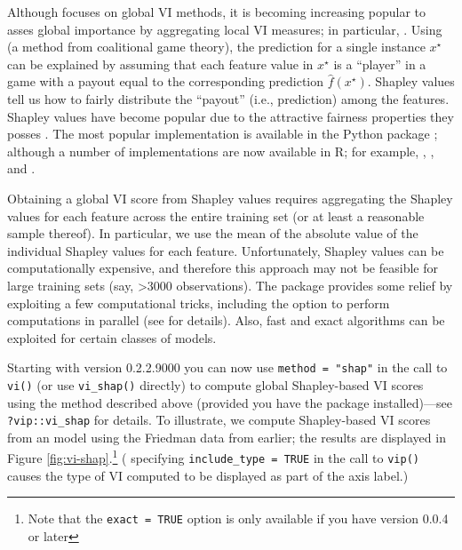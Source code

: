 Although  focuses on global VI methods, it is becoming
increasing popular to asses global importance by aggregating local VI
measures; in particular, 
\citep{strumbelj-2014-explaining}. Using  (a method
from coalitional game theory), the prediction for a single instance
\(x^\star\) can be explained by assuming that each feature value in
\(x^\star\) is a ``player'' in a game with a payout equal to the
corresponding prediction \(\widehat{f}\left(x^\star\right)\). Shapley
values tell us how to fairly distribute the ``payout'' (i.e.,
prediction) among the features. Shapley values have become popular due
to the attractive fairness properties they posses
\citep{lundberg_unified_2017}. The most popular implementation is
available in the Python  package
\citep{lundberg_unified_2017}; although a number of implementations are
now available in R; for example, , 
\citep{R-iBreakDown}, and  \citep{R-fastshap}.

Obtaining a global VI score from Shapley values requires aggregating the
Shapley values for each feature across the entire training set (or at
least a reasonable sample thereof). In particular, we use the mean of
the absolute value of the individual Shapley values for each feature.
Unfortunately, Shapley values can be computationally expensive, and
therefore this approach may not be feasible for large training sets
(say, \textgreater3000 observations). The  package
provides some relief by exploiting a few computational tricks, including
the option to perform computations in parallel (see
 for details). Also, fast and exact algorithms
\citep{lundberg-explainable-2019} can be exploited for certain classes
of models.

Starting with  version 0.2.2.9000 you can now use
\texttt{method\ =\ "shap"} in the call to \texttt{vi()} (or use
\texttt{vi\_shap()} directly) to compute global Shapley-based VI scores
using the method described above (provided you have the 
package installed)---see \texttt{?vip::vi\_shap} for details. To
illustrate, we compute Shapley-based VI scores from an 
model \citep{R-xgboost} using the Friedman data from earlier; the
results are displayed in Figure \ref{fig:vi-shap}.\footnote{Note that
  the \texttt{exact\ =\ TRUE} option is only available if you have
   version 0.0.4 or later} ( specifying
\texttt{include\_type\ =\ TRUE} in the call to \texttt{vip()} causes the
type of VI computed to be displayed as part of the axis label.)

